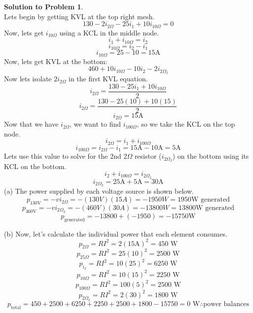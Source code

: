 \documentclass[11pt,letterpaper]{article}
\theoremstyle{definition}
\newtheorem{solprob}{\textcolor{solproblemcolor}{Solution to Problem}}  %
\begin{document}
\begin{solprob} \text{}\\
    Lets begin by getting KVL at the top right mesh.
    \[130 - 2\text{$i_\text{$2\Omega$}$} - 25i_1 + 10\text{$i_\text{$10\Omega$}$} = 0\]
    Now, lets get $i_\text{$10\Omega$}$ using a KCL in the middle node.
    \[i_1 + i_\text{$10\Omega$} = i_2\]
    \[i_\text{$10\Omega$} = i_2-i_1\]
    \[i_\text{$10\Omega$} = 25-10 = 15\text{A}\]
    Now, lets get KVL at the bottom:
    \[460 + 10\text{$i_\text{$10\Omega$}$} - 10i_2 - 2\text{$i_\text{$2\Omega_2$}$}\]
    Now lets isolate $2\text{$i_\text{$2\Omega$}$}$ in the first KVL equation.
    \[i_\text{$2\Omega$} = \frac{130-25i_1 + 10\text{$i_\text{$10\Omega$}$}}{2}\]
    \[i_\text{$2\Omega$} = \frac{130-25(10) + 10(15)}{2}\]
    \[i_\text{$2\Omega$} = 15\text{A}\]
    Now that we have $i_\text{$2\Omega$}$, we want to find $i_\text{$100\Omega$}$, so we take the KCL on the top node.
    \[i_\text{$2\Omega$} = i_1 + i_\text{$100\Omega$}\]
    \[i_\text{$100\Omega$} = i_\text{$2\Omega$} - i_1 = 15\text{A}-10\text{A} = 5\text{A}\]
    Lets use this value to solve for the 2nd 2$\Omega$ resistor ($i_\text{$2\Omega_\text{2}$}$) on the bottom using its KCL on the bottom.
    \[i_2 + i_\text{$100\Omega$} = i_\text{$2\Omega_\text{2}$}\]
    \[i_\text{$2\Omega_\text{2}$} = 25\text{A} + 5\text{A} = 30\text{A}\]
    (a)
    The power supplied by each voltage source is shown below.
    \[p_\text{130V} = -vi_\text{$2\Omega$} = -(130V)(15A) = -1950W = 1950 \text{W generated}\]
    \[p_\text{460V} = -vi_\text{$2\Omega_\text{2}$} = -(460V)(30A) = -13800W = 13800\text{W generated}\]
    \[p_\text{generated} = -13800 + (-1950) = -15750 \text{W}\]

    (b)
    Now, let's calculate the individual power that each element consumes.
    \[p_\text{2$\Omega$} = RI^2 = 2(15\text{A})^2 = 450 \text{ W}\]
    \[p_\text{$25\Omega$} = RI^2 = 25(10)^2 = 2500 \text{ W}\]
    \[p_\text{$i_2$} = RI^2 = 10(25)^2 = 6250 \text{ W}\]
    \[p_\text{$10\Omega$} = RI^2 = 10(15)^2 = 2250 \text{ W}\]
    \[p_\text{$100\Omega$} = RI^2 = 100(5)^2 = 2500 \text{ W}\]
    \[p_\text{$2\Omega_2$} = RI^2 = 2(30)^2 = 1800 \text{ W}\]
    \[p_\text{total} = 450 + 2500 + 6250 + 2250 + 2500 + 1800 - 15750 = 0 \text{ W} \therefore \text{power balances}\]
    
\end{solprob}

\noindent\makebox[\linewidth]{\color{rouge_poly}{\rule{\textwidth}{1.3pt}}}	
\end{document}
